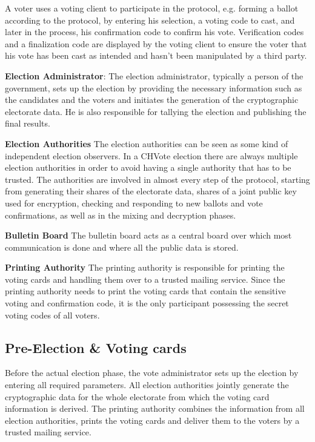 A voter uses a voting client to participate in the protocol, e.g. forming a ballot according to the protocol, by entering his selection, a voting code to cast, and later in the process, his confirmation code to confirm his vote. Verification codes and a finalization code are displayed by the voting client to ensure the voter that his vote has been cast as intended and hasn't been manipulated by a third party.

\textbf{Election Administrator}: The election administrator, typically a person of the government, sets up the election by providing the necessary information such as the candidates and the voters and initiates the generation of the cryptographic electorate data. He is also responsible for tallying the election and publishing the final results.

\textbf{Election Authorities}
The election authorities can be seen as some kind of independent election observers. In a CHVote election there are always multiple election authorities in order to avoid having a single authority that has to be trusted. The authorities are involved in almost every step of the protocol, starting from generating their shares of the electorate data, shares of a joint public key used for encryption, checking and responding to new ballots and vote confirmations, as well as in the mixing and decryption phases.

\textbf{Bulletin Board}
The bulletin board acts as a central board over which most communication is done and where all the public data is stored.

\textbf{Printing Authority}
The printing authority is responsible for printing the voting cards and handling them over to a trusted mailing service. Since the printing authority needs to print the voting cards that contain the sensitive voting and confirmation code, it is the only participant possessing the secret voting codes of all voters.  

\subsection{Pre-Election \& Voting cards}
Before the actual election phase, the vote administrator sets up the election by entering all required parameters. All election authorities jointly generate the cryptographic data for the whole electorate from which the voting card information is derived. The printing authority combines the information from all election authorities, prints the voting cards and deliver them to the voters by a trusted mailing service. 

